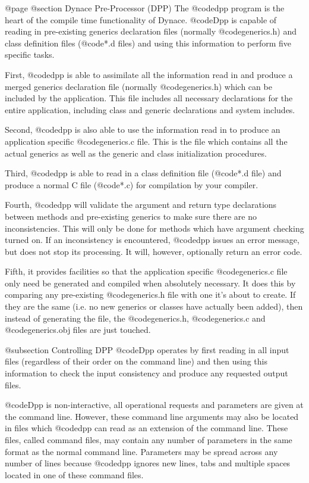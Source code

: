 @page
@section Dynace Pre-Processor (DPP)
The @code{dpp} program is the heart of the compile time functionality of
Dynace.  @code{Dpp} is capable of reading in pre-existing generics
declaration files (normally @code{generics.h}) and class
definition files (@code{*.d} files) and using this information to
perform five specific tasks.

First, @code{dpp} is able to assimilate all the information read
in and produce a merged generics declaration file (normally
@code{generics.h}) which can be included by the application.
This file includes all necessary declarations for the entire application,
including class and generic declarations and system includes.

Second, @code{dpp} is also able to use the information read in
to produce an application specific @code{generics.c} file.
This is the file which contains all the actual generics as well
as the generic and class initialization procedures.

Third, @code{dpp} is able to read in a class definition file
(@code{*.d} file) and produce a normal C file (@code{*.c})
for compilation by your compiler.

Fourth, @code{dpp} will validate the argument and return type
declarations between methods and pre-existing generics to make sure
there are no inconsistencies.  This will only be done for methods which
have argument checking turned on.  If an inconsistency is encountered,
@code{dpp} issues an error message, but does not stop its processing.
It will, however, optionally return an error code.

Fifth, it provides facilities so that the application specific
@code{generics.c} file only need be generated and compiled when
absolutely necessary.  It does this by comparing any pre-existing
@code{generics.h} file with one it's about to create.  If they are the
same (i.e. no new generics or classes have actually been added), then
instead of generating the file, the @code{generics.h}, @code{generics.c}
and @code{generics.obj} files are just touched.


@subsection Controlling DPP
@code{Dpp} operates by first reading in all input files (regardless
of their order on the command line) and then using this information
to check the input consistency and produce any requested output files.

@code{Dpp} is non-interactive, all operational requests and parameters
are given at the command line.  However, these command line arguments
may also be located in files which @code{dpp} can read as an extension
of the command line.  These files, called command files, may contain
any number of parameters in the same format as the normal command line.
Parameters may be spread across any number of lines because @code{dpp}
ignores new lines, tabs and multiple spaces located in one of these
command files.

